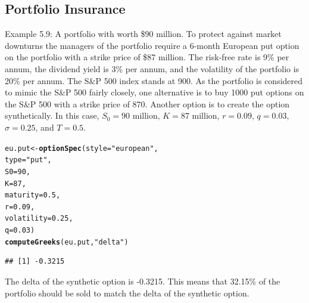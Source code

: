 \documentclass{article}\usepackage[]{graphicx}\usepackage[]{color}
\makeatletter
\newcommand{\hlstr}[1]{\textcolor[rgb]{0.192,0.494,0.8}{#1}}%
\newcommand{\hlkwd}[1]{\textcolor[rgb]{0.737,0.353,0.396}{\textbf{#1}}}%
\newenvironment{kframe}{%
 \def\at@end@of@kframe{}%
 \ifinner\ifhmode%
  \def\at@end@of@kframe{\end{minipage}}%
  \begin{minipage}{\columnwidth}%
 \fi\fi%
 \def\FrameCommand##1{\hskip\@totalleftmargin \hskip-\fboxsep
 \colorbox{shadecolor}{##1}\hskip-\fboxsep
     \hskip-\linewidth \hskip-\@totalleftmargin \hskip\columnwidth}%
 \MakeFramed {\advance\hsize-\width
   \@totalleftmargin\z@ \linewidth\hsize
   \@setminipage}}%
 {\par\unskip\endMakeFramed%
 \at@end@of@kframe}
\newenvironment{knitrout}{}{} %
\makeatother
\begin{document}
\subsection{Portfolio Insurance}
Example 5.9: A portfolio with worth \$90 million. To protect against market downturns the managers of the portfolio require a 6-month European put option on the portfolio with a strike price of \$87 million. The risk-free rate is 9\% per annum, the dividend yield is 3\% per annum, and the volatility of the portfolio is 20\% per annum. The S\&P 500 index stands at 900. As the portfolio is considered to mimic the S\&P 500 fairly closely, one alternative is to buy 1000 put options on the S\&P 500 with a strike price of 870. Another option is to create the option synthetically. In this case, $S_0 = 90$ million, $K = 87$ million, $r = 0.09$, $q = 0.03$, $\sigma = 0.25$, and $T = 0.5$.

\begin{knitrout}
\color{fgcolor}\begin{kframe}
\begin{alltt}
eu.put <- \hlkwd{optionSpec}(style = \hlstr{"european"}, 
                     type = \hlstr{"put"}, 
                     S0 = 90, 
                     K = 87,
                     maturity = 0.5, 
                     r = 0.09,
                     volatility = 0.25,
                     q = 0.03)
\hlkwd{computeGreeks}(eu.put, \hlstr{"delta"})
\end{alltt}
\begin{verbatim}
## [1] -0.3215
\end{verbatim}
\end{kframe}
\end{knitrout}


The delta of the synthetic option is -0.3215. This means that 32.15\% of the portfolio should be sold to match the delta of the synthetic option.


\end{document}
